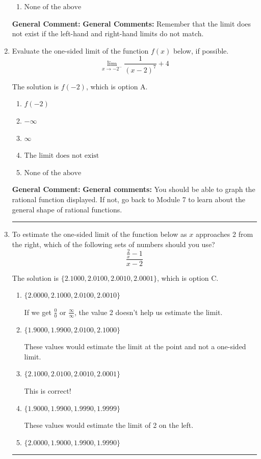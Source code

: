 \documentclass{extbook}[14pt]
\newcommand{\litem}[1]{\item #1

\rule{\textwidth}{0.4pt}}
\begin{document}
\begin{enumerate}
{\begin{enumerate}[label=\Alph*.]
\item \( \text{None of the above} \)


\end{enumerate}

\textbf{General Comment:} \textbf{General Comments:} Remember that the limit does not exist if the left-hand and right-hand limits do not match.
}
\litem{
Evaluate the one-sided limit of the function $f(x)$ below, if possible.
\[ \lim_{x \rightarrow -2^-} \frac{1}{(x-2)^7}+4 \]

The solution is \( f(-2) \), which is option A.\begin{enumerate}[label=\Alph*.]
\item \( f(-2) \)


\item \( -\infty \)


\item \( \infty \)


\item \( \text{The limit does not exist} \)


\item \( \text{None of the above} \)


\end{enumerate}

\textbf{General Comment:} \textbf{General comments:} You should be able to graph the rational function displayed. If not, go back to Module 7 to learn about the general shape of rational functions.
}
\litem{
To estimate the one-sided limit of the function below as $x$ approaches 2 from the right, which of the following sets of numbers should you use?
\[ \frac{\frac{2}{x} - 1}{x - 2} \]

The solution is \( \{ 2.1000, 2.0100, 2.0010, 2.0001 \} \), which is option C.\begin{enumerate}[label=\Alph*.]
\item \( \{ 2.0000, 2.1000, 2.0100, 2.0010 \} \)

If we get $\frac{0}{0}$ or $\frac{\infty}{\infty}$, the value 2 doesn't help us estimate the limit.
\item \( \{ 1.9000, 1.9900, 2.0100, 2.1000 \} \)

These values would estimate the limit at the point and not a one-sided limit.
\item \( \{ 2.1000, 2.0100, 2.0010, 2.0001 \} \)

This is correct!
\item \( \{ 1.9000, 1.9900, 1.9990, 1.9999 \} \)

These values would estimate the limit of 2 on the left.
\item \( \{ 2.0000, 1.9000, 1.9900, 1.9990 \} \)


\end{enumerate}}
\end{enumerate}
\end{document}
